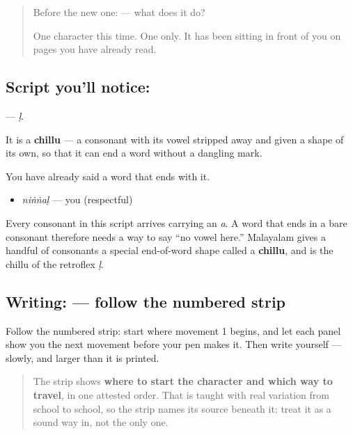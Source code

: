 \label{lesson:ML-S06-letter-chillu-ll}



\begin{quote}
Before the new one:  — what does it do?

One character this time. One only. It has been sitting in front of you on pages you have already read.
\end{quote}

\subsection*{Script you'll notice: }
\textbf{} — \emph{ḷ}.

It is a \textbf{chillu} — a consonant with its vowel stripped away and given a shape of its own, so that it can end a word without a dangling mark.

You have already said a word that ends with it.

\begin{itemize}
\raggedright
  \item \textbf{} \emph{niṅṅaḷ} — you (respectful)
\end{itemize}

Every consonant in this script arrives carrying an \emph{a}. A word that ends in a bare consonant therefore needs a way to say \textquotedblleft{}no vowel here.\textquotedblright{} Malayalam gives a handful of consonants a special end-of-word shape called a \textbf{chillu}, and \textbf{} is the chillu of the retroflex \emph{ḷ}.

\subsection*{Writing:  — follow the numbered strip}

Follow the numbered strip: start where movement 1 begins, and let each panel show you the next movement before your pen makes it. Then write  yourself — slowly, and larger than it is printed.

\begin{quote}
The strip shows \textbf{where to start the character and which way to travel}, in one attested order. That is taught with real variation from school to school, so the strip names its source beneath it: treat it as a sound way in, not the only one.
\end{quote}

